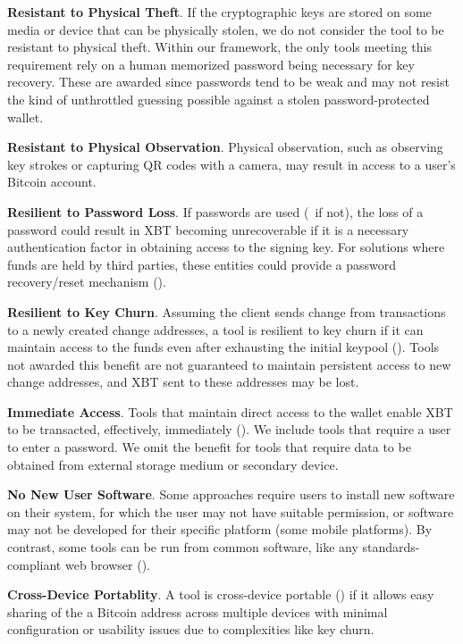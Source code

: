 \textbf{Resistant to Physical Theft}.
\label{Resistant to Physical Theft}
If the cryptographic keys are stored on some media or device that can be physically stolen, we do not consider the tool to be resistant to physical theft. Within our framework, the only tools meeting this requirement rely on a human memorized password being necessary for key recovery. These are awarded \prt since passwords tend to be weak and may not resist the kind of unthrottled guessing possible against a stolen password-protected wallet. 

\textbf{Resistant to Physical Observation}.
\label{Resistant to Physical Observation}
Physical observation, such as observing key strokes or capturing QR codes with a camera, may result in access to a user's Bitcoin account. 

\textbf{Resilient to Password Loss}.
\label{Resilient to Password Loss}
If passwords are used (\full~if not), the loss of a password could result in XBT becoming unrecoverable if it is a necessary authentication factor in obtaining access to the signing key. For solutions where funds are held by third parties, these entities could provide a password recovery/reset mechanism (\full).

\textbf{Resilient to Key Churn}.
\label{Compatible with Change Keys}
Assuming the client sends change from transactions to a newly created change addresses, a tool is resilient to key churn if it can maintain access to the funds even after exhausting the initial keypool (\full). Tools not awarded this benefit are not guaranteed to maintain persistent access to new change addresses, and XBT sent to these addresses may be lost.

\textbf{Immediate Access}.
\label{Immediate Access}
Tools that maintain direct access to the wallet enable XBT to be transacted, effectively, immediately (\full). We include tools that require a user to enter a password. We omit the benefit for tools that require data to be obtained from external storage medium or secondary device. 

\textbf{No New User Software}.
\label{No New Software}
Some approaches require users to install new software on their system, for which the user may not have suitable permission, or software may not be developed for their specific platform (\eg some mobile platforms). By contrast, some tools can be run from common software, like any standards-compliant web browser (\full). 

\textbf{Cross-Device Portablity}.
\label{Portable}
A tool is cross-device portable (\full) if it allows easy sharing of the a Bitcoin address across multiple devices with minimal configuration or usability issues due to complexities like key churn.


